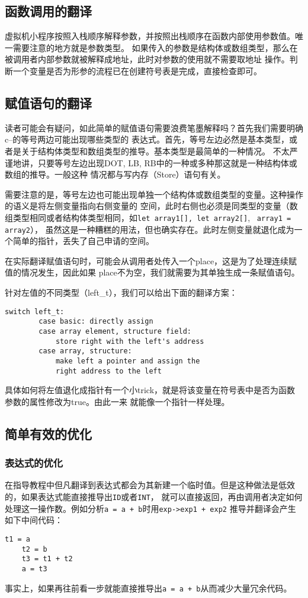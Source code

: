 \documentclass[twocolumn]{article}
\begin{document}
\subsection{函数调用的翻译}
虚拟机小程序按照入栈顺序解释参数，并按照出栈顺序在函数内部使用参数值。唯一需要注意的地方就是参数类型。
如果传入的参数是结构体或数组类型，那么在被调用者内部参数就被解释成地址，此时对参数的使用就不需要取地址
操作。判断一个变量是否为形参的流程已在创建符号表是完成，直接检查即可。

\subsection{赋值语句的翻译}
读者可能会有疑问，如此简单的赋值语句需要浪费笔墨解释吗？首先我们需要明确c--的等号两边可能出现哪些类型的
表达式。首先，等号左边必然是基本类型，或者是关于结构体类型和数组类型的推导。基本类型是最简单的一种情况。
不太严谨地讲，只要等号左边出现DOT, LB, RB中的一种或多种那这就是一种结构体或数组的推导。一般这种
情况都与写内存（Store）语句有关。

需要注意的是，等号左边也可能出现单独一个结构体或数组类型的变量。这种操作的语义是将左侧变量指向右侧变量的
空间，此时右侧也必须是同类型的变量（数组类型相同或者结构体类型相同，如\verb|let array1[], let array2[]|, \verb| array1 = array2|），
虽然这是一种糟糕的用法，但也确实存在。此时左侧变量就退化成为一个简单的指针，丢失了自己申请的空间。

在实际翻译赋值语句时，可能会从调用者处传入一个place，这是为了处理连续赋值的情况发生，因此如果
place不为空，我们就需要为其单独生成一条赋值语句。

针对左值的不同类型（left\_t），我们可以给出下面的翻译方案：
\begin{lstlisting}[style=style1]
    switch left_t:
        case basic: directly assign
        case array element, structure field: 
            store right with the left's address
        case array, structure: 
            make left a pointer and assign the 
            right address to the left
\end{lstlisting}

具体如何将左值退化成指针有一个小trick，就是将该变量在符号表中是否为函数参数的属性修改为true。由此一来
就能像一个指针一样处理。


\subsection{简单有效的优化}
\subsubsection{表达式的优化}
在指导教程中但凡翻译到表达式都会为其新建一个临时值。但是这种做法是低效的，如果表达式能直接推导出\verb|ID|或者\verb|INT|，
就可以直接返回，再由调用者决定如何处理这一操作数。例如分析\verb|a = a + b|时用\verb|exp->exp1 + exp2|
推导并翻译会产生如下中间代码：
\begin{lstlisting}[style=style1]
    t1 = a 
    t2 = b
    t3 = t1 + t2
    a = t3
\end{lstlisting}
事实上，如果再往前看一步就能直接推导出\verb|a = a + b|从而减少大量冗余代码。
\end{document}

